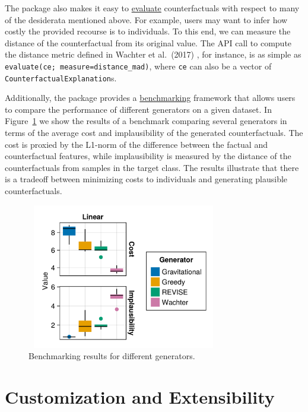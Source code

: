 \documentclass[
  letterpaper,
  DIV=11,
  numbers=noendperiod]{scrartcl}
\begin{document}
The package also makes it easy to
\href{https://juliatrustworthyai.github.io/CounterfactualExplanations.jl/v0.1/tutorials/evaluation/}{evaluate}
counterfactuals with respect to many of the desiderata mentioned above.
For example, users may want to infer how costly the provided recourse is
to individuals. To this end, we can measure the distance of the
counterfactual from its original value. The API call to compute the
distance metric defined in Wachter et al.~(2017)
\cite{wachter2017counterfactual}, for instance, is as simple as
\texttt{evaluate(ce;\ measure=distance\_mad)}, where \texttt{ce} can
also be a vector of \texttt{CounterfactualExplanation}s.

Additionally, the package provides a
\href{https://juliatrustworthyai.github.io/CounterfactualExplanations.jl/v0.1/tutorials/benchmarking/}{benchmarking}
framework that allows users to compare the performance of different
generators on a given dataset. In Figure~\ref{fig-bmk} we show the
results of a benchmark comparing several generators in terms of the
average cost and implausibility of the generated counterfactuals. The
cost is proxied by the L1-norm of the difference between the factual and
counterfactual features, while implausibility is measured by the
distance of the counterfactuals from samples in the target class. The
results illustrate that there is a tradeoff between minimizing costs to
individuals and generating plausible counterfactuals.

\begin{figure}

{\centering \includegraphics[width=3.33333in,height=2.5in]{www/bmk.png}

}

\caption{\label{fig-bmk}Benchmarking results for different generators.}

\end{figure}

\hypertarget{sec-custom}{%
\section{Customization and Extensibility}\label{sec-custom}}
\end{document}
